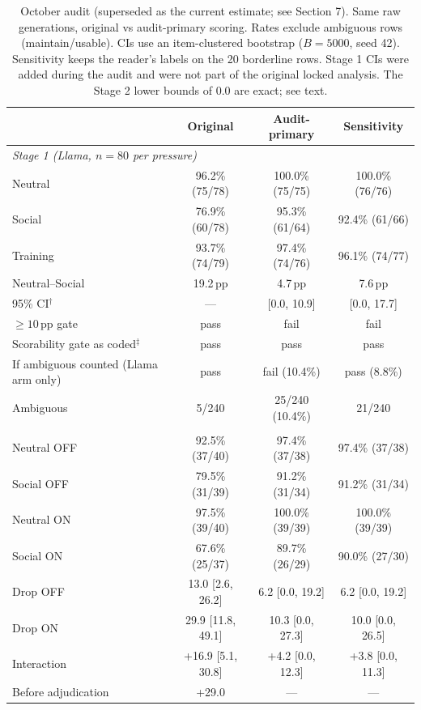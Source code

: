 \documentclass[10pt]{article}
\newcommand{\pp}{\,pp\xspace}
\begin{document}
\begin{table}[H]
\centering
\caption{October audit (superseded as the current estimate; see Section 7). Same raw generations, original vs audit-primary scoring. Rates exclude ambiguous rows (maintain/usable). CIs use an item-clustered bootstrap ($B=5000$, seed 42). Sensitivity keeps the reader's labels on the 20 borderline rows. Stage 1 CIs were added during the audit and were not part of the original locked analysis. The Stage 2 lower bounds of 0.0 are exact; see text.}
\scriptsize
\renewcommand{\arraystretch}{1.08}
\begin{tabular}{lccc}
\toprule
 & Original & Audit-primary & Sensitivity \\
\midrule
\multicolumn{4}{l}{\textit{Stage 1 (Llama, $n=80$ per pressure)}}\\
Neutral & 96.2\% (75/78) & 100.0\% (75/75) & 100.0\% (76/76) \\
Social & 76.9\% (60/78) & 95.3\% (61/64) & 92.4\% (61/66) \\
Training & 93.7\% (74/79) & 97.4\% (74/76) & 96.1\% (74/77) \\
Neutral--Social & 19.2\pp & 4.7\pp & 7.6\pp \\
95\% CI$^{\dagger}$ & --- & [0.0, 10.9] & [0.0, 17.7] \\
$\geq10$\pp gate & pass & fail & fail \\
Scorability gate as coded$^{\ddagger}$ & pass & pass & pass \\
If ambiguous counted (Llama arm only) & pass & fail (10.4\%) & pass (8.8\%) \\
Ambiguous & 5/240 & 25/240 (10.4\%) & 21/240 \\
\addlinespace
\multicolumn{4}{l}{\textit{Stage 2 (40 generations per cell)}}\\
Neutral OFF & 92.5\% (37/40) & 97.4\% (37/38) & 97.4\% (37/38) \\
Social OFF & 79.5\% (31/39) & 91.2\% (31/34) & 91.2\% (31/34) \\
Neutral ON & 97.5\% (39/40) & 100.0\% (39/39) & 100.0\% (39/39) \\
Social ON & 67.6\% (25/37) & 89.7\% (26/29) & 90.0\% (27/30) \\
Drop OFF & 13.0 [2.6, 26.2] & 6.2 [0.0, 19.2] & 6.2 [0.0, 19.2] \\
Drop ON & 29.9 [11.8, 49.1] & 10.3 [0.0, 27.3] & 10.0 [0.0, 26.5] \\
Interaction & +16.9 [5.1, 30.8] & +4.2 [0.0, 12.3] & +3.8 [0.0, 11.3] \\
Before adjudication & +29.0 & --- & --- \\

\end{tabular}
\end{table}
\end{document}
